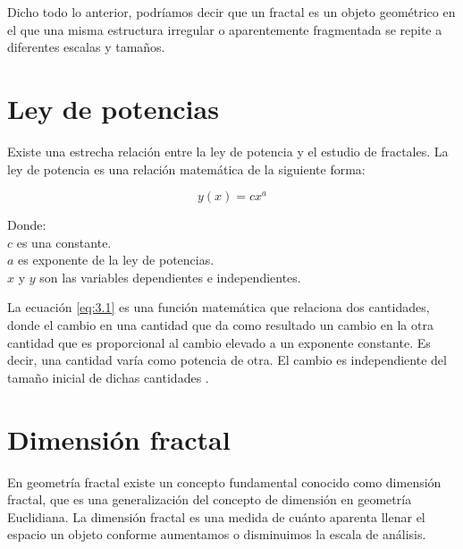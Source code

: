 Dicho todo lo anterior, podríamos decir que un fractal es un objeto geométrico en el que una misma estructura irregular o aparentemente fragmentada se repite a diferentes escalas y tamaños. 

\section{Ley de potencias} 

Existe una estrecha relación entre la ley de potencia y el estudio de fractales. La ley de potencia es una relación matemática de la siguiente forma:

\begin{equation}
	y(x) = cx^{a}
	\label{eq:3.1}
\end{equation}

Donde:\\
$c$ es una constante.\\
$a$ es exponente de la ley de potencias.\\
$x$ y $y$ son las variables dependientes e independientes. 

La ecuación \ref{eq:3.1} es una función matemática que relaciona dos cantidades, donde el cambio en una cantidad que da como resultado un cambio en la otra cantidad que es proporcional al cambio elevado a un exponente constante. Es decir, una cantidad varía como potencia de otra. El cambio es independiente del tamaño inicial de dichas cantidades \cite{Meakin1998}.

\section{Dimensi\'{o}n fractal}

En geometr\'{i}a fractal existe un concepto fundamental conocido como dimensi\'{o}n fractal, que es una generalizaci\'{o}n del concepto de dimensi\'{o}n en geometr\'{i}a Euclidiana. La dimensi\'{o}n fractal es una medida de cu\'{a}nto aparenta llenar el espacio un objeto conforme aumentamos o disminuimos la escala de an\'{a}lisis.




